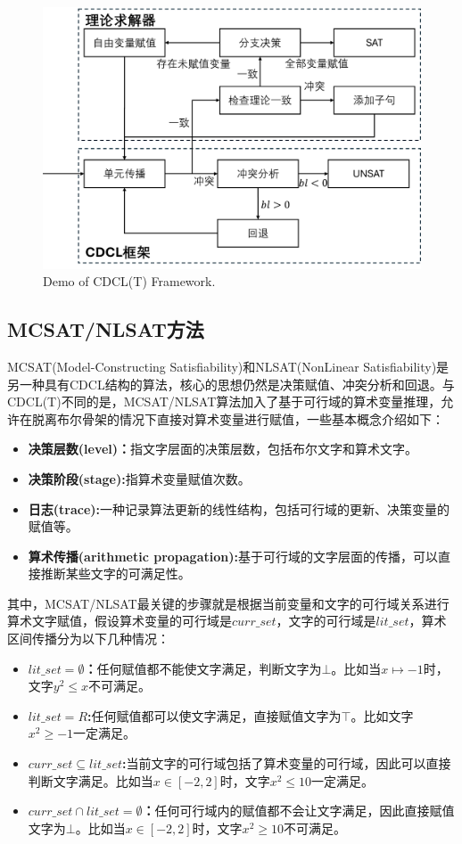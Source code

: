 \begin{figure}[t]
    \centering
    \includegraphics[width=0.6\columnwidth]{Img/cdcl_t.png}
     {Demo of CDCL(T) Framework.}
    \label{fig:cdclt}
\end{figure}

\subsection{MCSAT/NLSAT方法}
MCSAT(Model-Constructing Satisfiability)和NLSAT(NonLinear Satisfiability)是另一种具有CDCL结构的算法，核心的思想仍然是决策赋值、冲突分析和回退。与CDCL(T)不同的是，MCSAT/NLSAT算法加入了基于可行域的算术变量推理，允许在脱离布尔骨架的情况下直接对算术变量进行赋值，一些基本概念介绍如下：
\begin{itemize}
    \item \textbf{决策层数(level)：}指文字层面的决策层数，包括布尔文字和算术文字。
    \item \textbf{决策阶段(stage):}指算术变量赋值次数。
    \item \textbf{日志(trace):}一种记录算法更新的线性结构，包括可行域的更新、决策变量的赋值等。
    \item \textbf{算术传播(arithmetic propagation):}基于可行域的文字层面的传播，可以直接推断某些文字的可满足性。
\end{itemize}
其中，MCSAT/NLSAT最关键的步骤就是根据当前变量和文字的可行域关系进行算术文字赋值，假设算术变量的可行域是$curr\_set$，文字的可行域是$lit\_set$，算术区间传播分为以下几种情况：
\begin{itemize}
    \item \textbf{$lit\_set = \emptyset$：}任何赋值都不能使文字满足，判断文字为$\bot$。比如当$x \mapsto -1$时，文字$y^2 \leq x$不可满足。
    \item \textbf{$lit\_set = R$:}任何赋值都可以使文字满足，直接赋值文字为$\top$。比如文字$x^2 \geq -1$一定满足。
    \item \textbf{$curr\_set \subseteq lit\_set$:}当前文字的可行域包括了算术变量的可行域，因此可以直接判断文字满足。比如当$x \in [-2, 2]$时，文字$x^2 \leq 10$一定满足。
    \item \textbf{$curr\_set \cap lit\_set = \emptyset$：}任何可行域内的赋值都不会让文字满足，因此直接赋值文字为$\bot$。比如当$x \in [-2, 2]$时，文字$x^2 \geq 10$不可满足。
\end{itemize}

